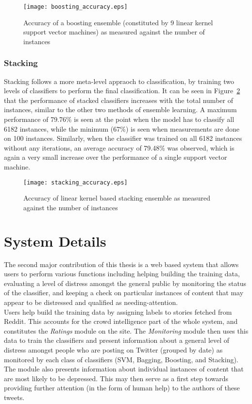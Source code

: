 \begin{figure}
    \centering
    \texttt{[image: boosting\_accuracy.eps]}
    \caption{Accuracy of a boosting ensemble (constituted by 9 linear kernel support vector machines) as measured against the number of instances}
    \label{fig:boosting_accuracy}
\end{figure}

\subsubsection{Stacking}
Stacking follows a more meta-level appraoch to classification, by training two levels of classifiers to perform the final classification. It can be seen in Figure~\ref{fig:stacking_accuracy} that the performance of stacked classifiers increases with the total number of instances, similar to the other two methods of ensemble learning. A maximum performance of 79.76\% is seen at the point when the model has to classify all 6182 instances, while the minimum (67\%) is seen when measurements are done on 100 instances. Similarly, when the classifier was trained on all 6182 instances without any iterations, an average accuracy of 79.48\% was observed, which is again a very small increase over the performance of a single support vector machine.

\begin{figure}
    \centering
    \texttt{[image: stacking\_accuracy.eps]}
    \caption{Accuracy of linear kernel based stacking ensemble as measured against the number of instances}
    \label{fig:stacking_accuracy}
\end{figure}

\section{System Details}
\label{section:system_details}

The second major contribution of this thesis is a web based system that allows users to perform various functions including helping building the training data, evaluating a level of distress amongst the general public by monitoring the status of the classifier, and keeping a check on particular instances of content that may appear to be distressed and qualified as needing-attention.\\

Users help build the training data by assigning labels to stories fetched from Reddit. This accounts for the crowd intelligence part of the whole system, and constitutes the \emph{Ratings} module on the site. The \emph{Monitoring} module then uses this data to train the classifiers and present information about a general level of distress amongst people who are posting on Twitter (grouped by date) as monitored by each class of classifiers (SVM, Bagging, Boosting, and Stacking). The module also presents information about individual instances of content that are most likely to be depressed. This may then serve as a first step towards providing further attention (in the form of human help) to the authors of these tweets.\\

